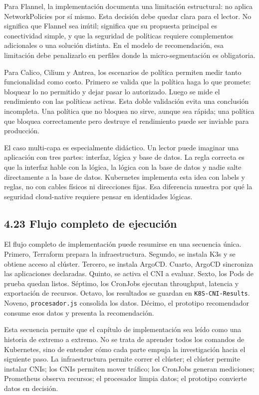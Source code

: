 \documentclass[journal]{IEEEtran}
\begin{document}
Para Flannel, la implementación documenta una limitación estructural: no aplica NetworkPolicies por sí mismo. Esta decisión debe quedar clara para el lector. No significa que Flannel sea inútil; significa que su propuesta principal es conectividad simple, y que la seguridad de políticas requiere complementos adicionales o una solución distinta. En el modelo de recomendación, esa limitación debe penalizarlo en perfiles donde la micro-segmentación es obligatoria.

Para Calico, Cilium y Antrea, los escenarios de política permiten medir tanto funcionalidad como costo. Primero se valida que la política haga lo que promete: bloquear lo no permitido y dejar pasar lo autorizado. Luego se mide el rendimiento con las políticas activas. Esta doble validación evita una conclusión incompleta. Una política que no bloquea no sirve, aunque sea rápida; una política que bloquea correctamente pero destruye el rendimiento puede ser inviable para producción.

El caso multi-capa es especialmente didáctico. Un lector puede imaginar una aplicación con tres partes: interfaz, lógica y base de datos. La regla correcta es que la interfaz hable con la lógica, la lógica con la base de datos y nadie salte directamente a la base de datos. Kubernetes implementa esta idea con labels y reglas, no con cables físicos ni direcciones fijas. Esa diferencia muestra por qué la seguridad cloud-native requiere pensar en identidades lógicas.

\subsection{4.23 Flujo completo de ejecución}

El flujo completo de implementación puede resumirse en una secuencia única. Primero, Terraform prepara la infraestructura. Segundo, se instala K3s y se obtiene acceso al clúster. Tercero, se instala ArgoCD. Cuarto, ArgoCD sincroniza las aplicaciones declaradas. Quinto, se activa el CNI a evaluar. Sexto, los Pods de prueba quedan listos. Séptimo, los CronJobs ejecutan throughput, latencia y exportación de recursos. Octavo, los resultados se guardan en \texttt{K8S-CNI-Results}. Noveno, \texttt{procesador.js} consolida los datos. Décimo, el prototipo recomendador consume esos datos y presenta la recomendación.

Esta secuencia permite que el capítulo de implementación sea leído como una historia de extremo a extremo. No se trata de aprender todos los comandos de Kubernetes, sino de entender cómo cada parte empuja la investigación hacia el siguiente paso. La infraestructura permite correr el clúster; el clúster permite instalar CNIs; los CNIs permiten mover tráfico; los CronJobs generan mediciones; Prometheus observa recursos; el procesador limpia datos; el prototipo convierte datos en decisión.
\end{document}
